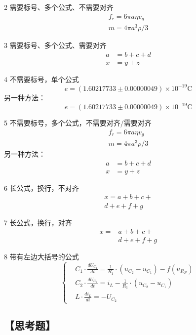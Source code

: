 \documentclass[12pt,a4paper,UTF8]{ctexart}
\begin{document}
	2 需要标号、多个公式、不需要对齐
		\begin{gather}
		f_r=6\pi a \eta v_g   \\
		m=4 \pi a^{3} \rho / 3
		\end{gather}

	3 需要标号、多个公式、需要对齐
		\begin{align}
		a &= b+c+d \\
		x &= y+z
		\end{align}

	4 不需要标号，单个公式
		\[e=(1.60217733 \pm 0.00000049) \times 10^{-19} \mathrm{C}\]
		另一种方法：
		\begin{equation*}
		e=(1.60217733 \pm 0.00000049) \times 10^{-19} \mathrm{C}
		\end{equation*}

	5 不需要标号，多个公式，不需要对齐/需要对齐
		\begin{gather*}
		f_r=6\pi a \eta v_g   \\
		m=4 \pi a^{3} \rho / 3
		\end{gather*}
		另一种方法：
		\begin{align*}
		a &= b+c+d \\
		x &= y+z
		\end{align*}

	6 长公式，换行，不对齐
		\begin{multline}
		x = a+b+c+{} \\
		d+e+f+g
		\end{multline}

	7 长公式，换行，对齐
		\[\begin{aligned}
		x ={}&a+b+c+{} \\
		&d+e+f+g
		\end{aligned}\]

	8 带有左边大括号的公式
	\[\left\{
		\begin{aligned}
		&C_{1} \cdot \frac{d U_{C_{1}}}{d t}=\frac{1}{R_{1}} \cdot(u_{C_{2}}-u_{C_{1}})-f(u_{R_{N}}) \\
		&C_{2} \cdot \frac{d U_{C_{2}}}{d t}=i_{L}-\frac{1}{R_{1}} \cdot(u_{C_{2}}-u_{C_{1}}) \\
		&L \cdot \frac{d i_{L}}{d t}=-U_{C_{2}}
		\end{aligned}
	   \right.
	\]


\subsection*{【思考题】}
\end{document}
